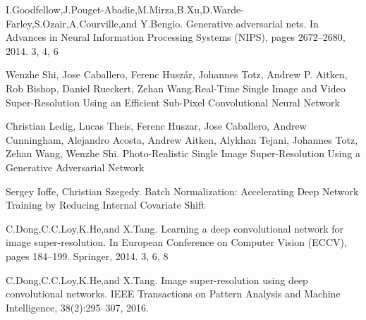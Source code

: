 \begin{thebibliography}{10}
I.Goodfellow,J.Pouget-Abadie,M.Mirza,B.Xu,D.Warde-Farley,S.Ozair,A.Courville,and Y.Bengio. Generative adversarial nets. In Advances in Neural Information Processing Systems (NIPS), pages 2672–2680, 2014. 3, 4, 6

Wenzhe Shi, Jose Caballero, Ferenc Huszár, Johannes Totz, Andrew P. Aitken, Rob Bishop, Daniel Rueckert, Zehan Wang.Real-Time Single Image and Video Super-Resolution Using an Efficient Sub-Pixel Convolutional Neural Network

Christian Ledig, Lucas Theis, Ferenc Huszar, Jose Caballero, Andrew Cunningham, Alejandro Acosta, Andrew Aitken, Alykhan Tejani, Johannes Totz, Zehan Wang, Wenzhe Shi. Photo-Realistic Single Image Super-Resolution Using a Generative Adversarial Network

Sergey Ioffe, Christian Szegedy. Batch Normalization: Accelerating Deep Network Training by Reducing Internal Covariate Shift 

C.Dong,C.C.Loy,K.He,and X.Tang. Learning a deep
convolutional network for image super-resolution. In European
Conference on Computer Vision (ECCV), pages 184–199. Springer,
2014. 3, 6, 8

C.Dong,C.C.Loy,K.He,and X.Tang. Image super-resolution
using deep convolutional networks. IEEE Transactions on Pattern
Analysis and Machine Intelligence, 38(2):295–307, 2016.
 
\end{thebibliography}